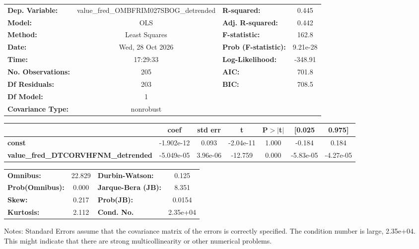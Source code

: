 \begin{center}
\begin{tabular}{lclc}
\toprule
\textbf{Dep. Variable:}                     & value\_fred\_OMBFRIM027SBOG\_detrended & \textbf{  R-squared:         } &     0.445   \\
\textbf{Model:}                             &                  OLS                   & \textbf{  Adj. R-squared:    } &     0.442   \\
\textbf{Method:}                            &             Least Squares              & \textbf{  F-statistic:       } &     162.8   \\
\textbf{Date:}                              &            Wed, 28 Oct 2026            & \textbf{  Prob (F-statistic):} &  9.21e-28   \\
\textbf{Time:}                              &                17:29:33                & \textbf{  Log-Likelihood:    } &   -348.91   \\
\textbf{No. Observations:}                  &                    205                 & \textbf{  AIC:               } &     701.8   \\
\textbf{Df Residuals:}                      &                    203                 & \textbf{  BIC:               } &     708.5   \\
\textbf{Df Model:}                          &                      1                 & \textbf{                     } &             \\
\textbf{Covariance Type:}                   &               nonrobust                & \textbf{                     } &             \\
\bottomrule
\end{tabular}
\begin{tabular}{lcccccc}
                                            & \textbf{coef} & \textbf{std err} & \textbf{t} & \textbf{P$> |$t$|$} & \textbf{[0.025} & \textbf{0.975]}  \\
\midrule
\textbf{const}                              &   -1.902e-12  &        0.093     & -2.04e-11  &         1.000        &       -0.184    &        0.184     \\
\textbf{value\_fred\_DTCORVHFNM\_detrended} &   -5.049e-05  &     3.96e-06     &   -12.759  &         0.000        &    -5.83e-05    &    -4.27e-05     \\
\bottomrule
\end{tabular}
\begin{tabular}{lclc}
\textbf{Omnibus:}       & 22.829 & \textbf{  Durbin-Watson:     } &    0.125  \\
\textbf{Prob(Omnibus):} &  0.000 & \textbf{  Jarque-Bera (JB):  } &    8.351  \\
\textbf{Skew:}          &  0.217 & \textbf{  Prob(JB):          } &   0.0154  \\
\textbf{Kurtosis:}      &  2.112 & \textbf{  Cond. No.          } & 2.35e+04  \\
\bottomrule
\end{tabular}
\end{center}

Notes: \newline
 [1] Standard Errors assume that the covariance matrix of the errors is correctly specified. \newline
 [2] The condition number is large, 2.35e+04. This might indicate that there are \newline
 strong multicollinearity or other numerical problems.